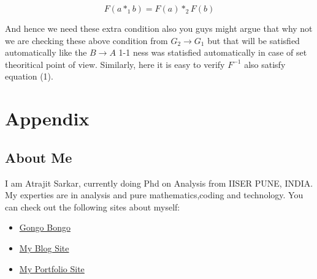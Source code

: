 \documentclass{article}
\begin{document}
\begin{equation}
  F(a*_1b)=F(a)*_2F(b)  
\end{equation}



And hence we need these extra condition also you guys might argue that why not we are checking these above condition from $G_2 \rightarrow G_1$ but that will be satisfied automatically like the $B \rightarrow A$ 1-1 ness was statisfied automatically in case of set theoritical point of view. Similarly, here it is easy to verify $F^{-1}$ also satisfy equation (1).

\section{Appendix}
\subsection{About Me}
I am Atrajit Sarkar, currently doing Phd on Analysis from IISER PUNE, INDIA. My experties are in analysis and pure mathematics,coding and technology.
You can check out the following sites about myself:
\begin{itemize}
    \item \href{www.gongobongo.org}{Gongo Bongo}
    \item \href{https://founder.gongobongo.org}{My Blog Site}
    \item \href{https://atrajit-sarkar.gongobongo.org}{My Portfolio Site}
\end{itemize}

\printbibliography
\end{document}
